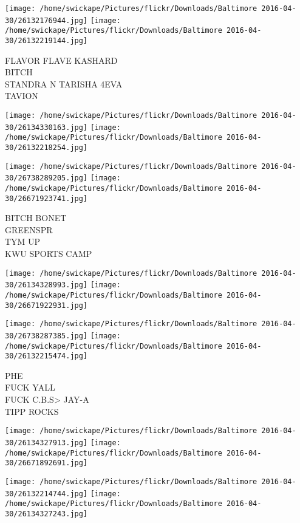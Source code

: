 \documentclass[10pt,letterpaper]{article}
\begin{document}
\texttt{[image: /home/swickape/Pictures/flickr/Downloads/Baltimore 2016-04-30/26132176944.jpg]}
\texttt{[image: /home/swickape/Pictures/flickr/Downloads/Baltimore 2016-04-30/26132219144.jpg]}

FLAVOR FLAVE KASHARD\\
BITCH\\
STANDRA N TARISHA 4EVA\\
TAVION\\
\pagebreak

\texttt{[image: /home/swickape/Pictures/flickr/Downloads/Baltimore 2016-04-30/26134330163.jpg]}
\texttt{[image: /home/swickape/Pictures/flickr/Downloads/Baltimore 2016-04-30/26132218254.jpg]}

\texttt{[image: /home/swickape/Pictures/flickr/Downloads/Baltimore 2016-04-30/26738289205.jpg]}
\texttt{[image: /home/swickape/Pictures/flickr/Downloads/Baltimore 2016-04-30/26671923741.jpg]}

BITCH BONET\\
GREENSPR\\
TYM UP\\
KWU SPORTS CAMP\\
\pagebreak

\texttt{[image: /home/swickape/Pictures/flickr/Downloads/Baltimore 2016-04-30/26134328993.jpg]}
\texttt{[image: /home/swickape/Pictures/flickr/Downloads/Baltimore 2016-04-30/26671922931.jpg]}

\texttt{[image: /home/swickape/Pictures/flickr/Downloads/Baltimore 2016-04-30/26738287385.jpg]}
\texttt{[image: /home/swickape/Pictures/flickr/Downloads/Baltimore 2016-04-30/26132215474.jpg]}

PHE\\
FUCK YALL\\
FUCK C.B.S> JAY{-}A\\
TIPP ROCKS\\
\pagebreak

\texttt{[image: /home/swickape/Pictures/flickr/Downloads/Baltimore 2016-04-30/26134327913.jpg]}
\texttt{[image: /home/swickape/Pictures/flickr/Downloads/Baltimore 2016-04-30/26671892691.jpg]}

\texttt{[image: /home/swickape/Pictures/flickr/Downloads/Baltimore 2016-04-30/26132214744.jpg]}
\texttt{[image: /home/swickape/Pictures/flickr/Downloads/Baltimore 2016-04-30/26134327243.jpg]}
\end{document}
